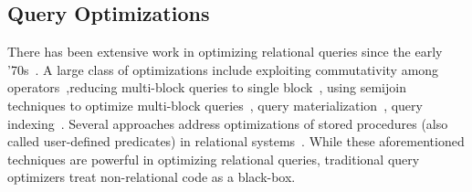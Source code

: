 \subsection{Query Optimizations}
There has been extensive work in optimizing relational queries since the early '70s~\cite{Chaudhuri:1998}. A large class of optimizations include exploiting commutativity among operators~\cite{Chaudhuri:1994,Yan:1995},reducing multi-block queries to single block~\cite{Kim:1982,Muralikrishna:1992}, using semijoin techniques to optimize multi-block queries~\cite{Mumick:1994,Seshadri:1996}, query materialization~\cite{Chaudhuri:1995,Phan:2008}, query indexing~\cite{SELLIS1988175,Bertino:1989,Fang:2008}. Several approaches address optimizations of stored procedures (also called user-defined predicates) in relational systems~\cite{Hellerstein:1993,Chimenti:1989}. While these aforementioned techniques are powerful in optimizing relational queries, traditional query optimizers treat non-relational code as a black-box.


